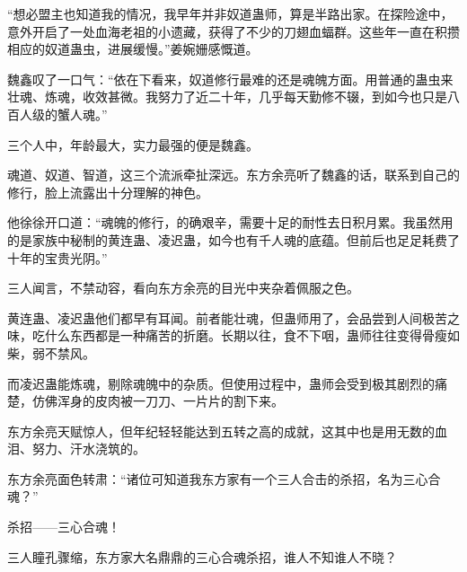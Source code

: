 \begin{this_body}
“想必盟主也知道我的情况，我早年并非奴道蛊师，算是半路出家。在探险途中，意外开启了一处血海老祖的小遗藏，获得了不少的刀翅血蝠群。这些年一直在积攒相应的奴道蛊虫，进展缓慢。”姜婉姗感慨道。

魏鑫叹了一口气：“依在下看来，奴道修行最难的还是魂魄方面。用普通的蛊虫来壮魂、炼魂，收效甚微。我努力了近二十年，几乎每天勤修不辍，到如今也只是八百人级的蟹人魂。”

三个人中，年龄最大，实力最强的便是魏鑫。

魂道、奴道、智道，这三个流派牵扯深远。东方余亮听了魏鑫的话，联系到自己的修行，脸上流露出十分理解的神色。

他徐徐开口道：“魂魄的修行，的确艰辛，需要十足的耐性去日积月累。我虽然用的是家族中秘制的黄连蛊、凌迟蛊，如今也有千人魂的底蕴。但前后也足足耗费了十年的宝贵光阴。”

三人闻言，不禁动容，看向东方余亮的目光中夹杂着佩服之色。

黄连蛊、凌迟蛊他们都早有耳闻。前者能壮魂，但蛊师用了，会品尝到人间极苦之味，吃什么东西都是一种痛苦的折磨。长期以往，食不下咽，蛊师往往变得骨瘦如柴，弱不禁风。

而凌迟蛊能炼魂，剔除魂魄中的杂质。但使用过程中，蛊师会受到极其剧烈的痛楚，仿佛浑身的皮肉被一刀刀、一片片的割下来。

东方余亮天赋惊人，但年纪轻轻能达到五转之高的成就，这其中也是用无数的血泪、努力、汗水浇筑的。

东方余亮面色转肃：“诸位可知道我东方家有一个三人合击的杀招，名为三心合魂？”

杀招——三心合魂！

三人瞳孔骤缩，东方家大名鼎鼎的三心合魂杀招，谁人不知谁人不晓？

\end{this_body}

